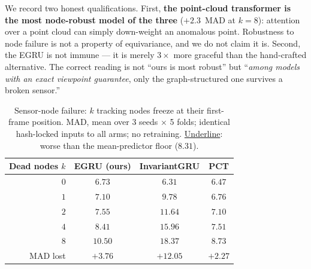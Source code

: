 We record two honest qualifications. First, \textbf{the point-cloud transformer is the most
node-robust model of the three} ($+2.3$~MAD at $k=8$): attention over a point cloud can simply
down-weight an anomalous point. Robustness to node failure is not a property of equivariance, and we
do not claim it is. Second, the EGRU is not immune --- it is merely $3\times$ more graceful than the
hand-crafted alternative. The correct reading is not ``ours is most robust'' but ``\emph{among models
with an exact viewpoint guarantee}, only the graph-structured one survives a broken sensor.''

\begin{table}[!t]
\centering
\caption{Sensor-node failure: $k$ tracking nodes freeze at their first-frame position. MAD, mean over
3 seeds $\times$ 5 folds; identical hash-locked inputs to all arms; no retraining. \underline{Underline}:
worse than the mean-predictor floor ($8.31$).}
\label{tab:nodefail}
\small
\begin{tabular}{rccc}
\toprule
Dead nodes $k$ & EGRU (ours) & InvariantGRU & PCT \\
\midrule
$0$ & $6.73$ & $6.31$ & $6.47$ \\
$1$ & $7.10$ & \underline{$9.78$}  & $6.76$ \\
$2$ & $7.55$ & \underline{$11.64$} & $7.10$ \\
$4$ & $8.41$ & \underline{$15.96$} & $7.51$ \\
$8$ & \underline{$10.50$} & \underline{$18.37$} & $8.73$ \\
\midrule
MAD lost & $+3.76$ & $+12.05$ & $\mathbf{+2.27}$ \\
\bottomrule
\end{tabular}
\end{table}

